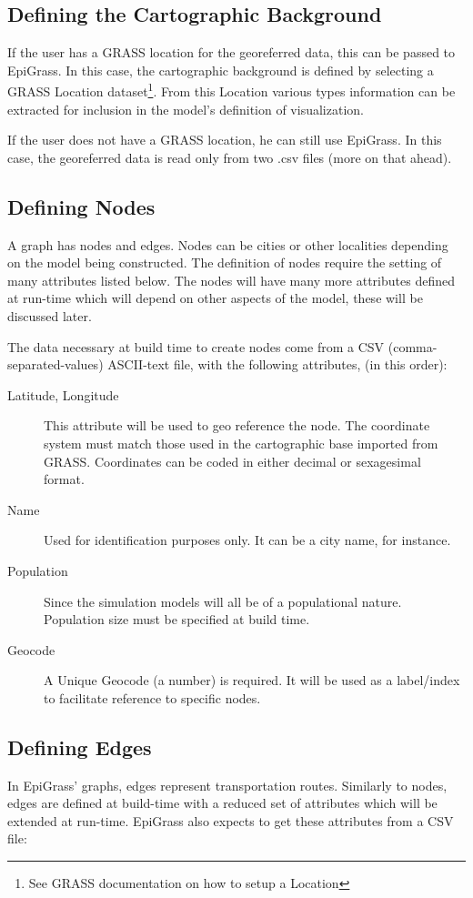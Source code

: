 \subsection{Defining the Cartographic Background}
If the user has a GRASS location for the georeferred data, this can be passed to EpiGrass. In this case, the cartographic background is defined by selecting a GRASS Location dataset\footnote{See GRASS documentation on how to setup a Location}. From this Location various types information can be extracted for inclusion in the model's definition of visualization.  

If the user does not have a GRASS location, he can still use EpiGrass. In this case, the georeferred data is read only from two .csv files (more on that ahead).

\subsection{Defining Nodes}   \label{sec:inodes}
A graph has nodes and edges. Nodes can be cities or other localities depending on the model being constructed. The definition of nodes require the setting of many attributes listed below. The nodes will have many more attributes defined at run-time which will depend on other aspects of the model, these will be discussed later.

The data necessary at build time to create nodes come from a CSV (comma-separated-values) ASCII-text file, with the following attributes, (in this order):
\begin{description}
\item [Latitude, Longitude] This attribute will be used to geo reference the  node. The coordinate system must match those used in the cartographic base imported from GRASS. Coordinates can be coded in either decimal or sexagesimal format.
\item [Name] Used for identification purposes only. It can be a city name, for instance.
\item [Population] Since the simulation models will all be of a populational nature. Population size must be specified at build time.
\item [Geocode] A Unique Geocode (a number) is required. It will be used as a label/index to facilitate  reference to specific nodes.
 \end{description}

\subsection{Defining Edges} \label{sec:iedges}
In EpiGrass' graphs, edges represent transportation routes. Similarly to nodes, edges are defined at build-time with a reduced set of attributes which will be extended at run-time. EpiGrass also expects to get these attributes from a CSV file:

